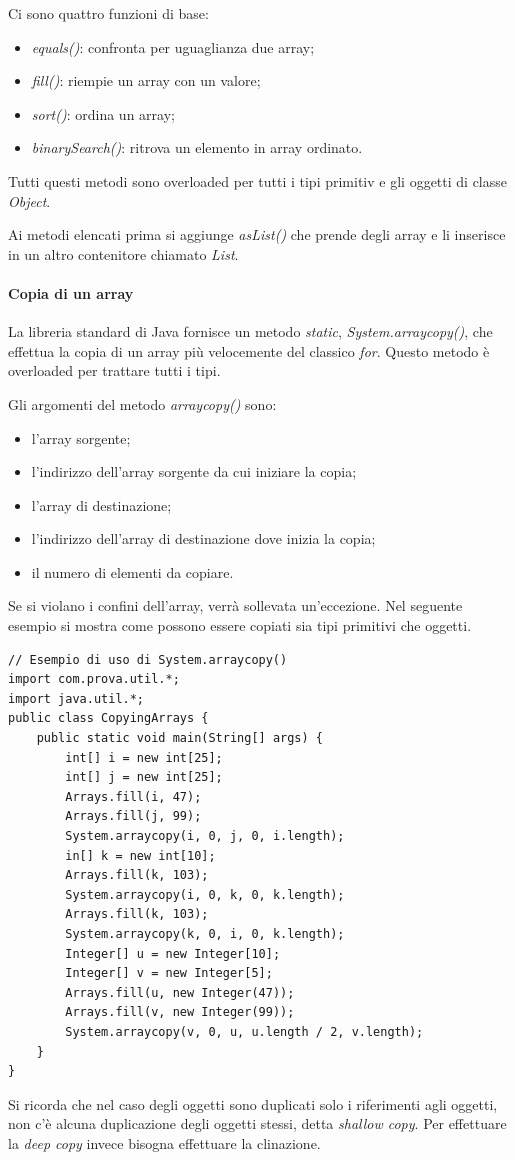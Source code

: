 \documentclass[12pt]{report}
\begin{document}
Ci sono quattro funzioni di base:
\begin{itemize}
	\item \textit{equals()}: confronta per uguaglianza due array;
	\item \textit{fill()}: riempie un array con un valore;
	\item \textit{sort()}: ordina un array;
	\item \textit{binarySearch()}: ritrova un elemento in array ordinato.
\end{itemize}
Tutti questi metodi sono overloaded per tutti i tipi primitiv e gli oggetti di classe \textit{Object}.

Ai metodi elencati prima si aggiunge \textit{asList()} che prende degli array e li inserisce in un altro contenitore chiamato \textit{List}.

\paragraph{Copia di un array}
La libreria standard di Java fornisce un metodo \textit{static}, \textit{System.arraycopy()}, che effettua la copia di un array più velocemente del classico \textit{for}. Questo metodo è overloaded per trattare tutti i tipi.

Gli argomenti del metodo \textit{arraycopy()} sono:
\begin{itemize}
	\item l'array sorgente;
	\item l'indirizzo dell'array sorgente da cui iniziare la copia;
	\item l'array di destinazione;
	\item l'indirizzo dell'array di destinazione dove inizia la copia;
	\item il numero di elementi da copiare.
\end{itemize}
Se si violano i confini dell'array, verrà sollevata un'eccezione. Nel seguente esempio si mostra come possono essere copiati sia tipi primitivi che oggetti.
\begin{lstlisting}[style=javastyle]
// Esempio di uso di System.arraycopy()
import com.prova.util.*;
import java.util.*;
public class CopyingArrays {
	public static void main(String[] args) {
		int[] i = new int[25];
		int[] j = new int[25];
		Arrays.fill(i, 47);
		Arrays.fill(j, 99);
		System.arraycopy(i, 0, j, 0, i.length);
		in[] k = new int[10];
		Arrays.fill(k, 103);
		System.arraycopy(i, 0, k, 0, k.length);
		Arrays.fill(k, 103);
		System.arraycopy(k, 0, i, 0, k.length);
		Integer[] u = new Integer[10];
		Integer[] v = new Integer[5];
		Arrays.fill(u, new Integer(47));
		Arrays.fill(v, new Integer(99));
		System.arraycopy(v, 0, u, u.length / 2, v.length);
	}
}
\end{lstlisting}
Si ricorda che nel caso degli oggetti sono duplicati solo i riferimenti agli oggetti, non c'è alcuna duplicazione degli oggetti stessi, detta \textit{shallow copy}.  Per effettuare la \textit{deep copy} invece bisogna effettuare la clinazione.
\end{document}
